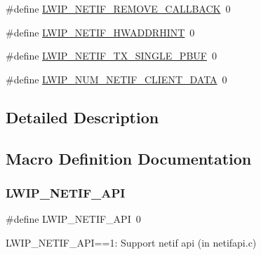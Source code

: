 \begin{DoxyCompactItemize}
\item 
\#define \hyperlink{group__lwip__opts__netif_ga9c942c2e9655b06d4f73c630d30f60bf}{L\+W\+I\+P\+\_\+\+N\+E\+T\+I\+F\+\_\+\+R\+E\+M\+O\+V\+E\+\_\+\+C\+A\+L\+L\+B\+A\+CK}~0
\item 
\#define \hyperlink{group__lwip__opts__netif_gad1d5e878d94b56ba687cef69be936ad9}{L\+W\+I\+P\+\_\+\+N\+E\+T\+I\+F\+\_\+\+H\+W\+A\+D\+D\+R\+H\+I\+NT}~0
\item 
\#define \hyperlink{group__lwip__opts__netif_gabafb9f64a80e51b56c0abbcfc1f7e04e}{L\+W\+I\+P\+\_\+\+N\+E\+T\+I\+F\+\_\+\+T\+X\+\_\+\+S\+I\+N\+G\+L\+E\+\_\+\+P\+B\+UF}~0
\item 
\#define \hyperlink{group__lwip__opts__netif_ga94a35212616f9a9aae5c98741612b936}{L\+W\+I\+P\+\_\+\+N\+U\+M\+\_\+\+N\+E\+T\+I\+F\+\_\+\+C\+L\+I\+E\+N\+T\+\_\+\+D\+A\+TA}~0
\end{DoxyCompactItemize}


\subsection{Detailed Description}


\subsection{Macro Definition Documentation}
\mbox{\label{group__lwip__opts__netif_gadd45fb65f2d0e6de5a0d14ff9e101b77}} 
\subsubsection{\texorpdfstring{L\+W\+I\+P\+\_\+\+N\+E\+T\+I\+F\+\_\+\+A\+PI}{LWIP\_NETIF\_API}\hspace{0.1cm}{\footnotesize\ttfamily [1/2]}}
{\footnotesize\ttfamily \#define L\+W\+I\+P\+\_\+\+N\+E\+T\+I\+F\+\_\+\+A\+PI~0}

L\+W\+I\+P\+\_\+\+N\+E\+T\+I\+F\+\_\+\+A\+PI==1\+: Support netif api (in netifapi.\+c) \mbox{\label{group__lwip__opts__netif_gadd45fb65f2d0e6de5a0d14ff9e101b77}} 
